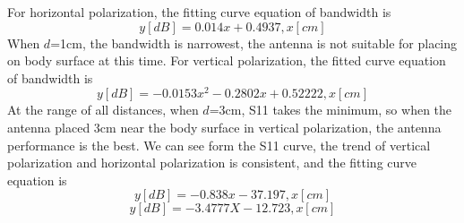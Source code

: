 \documentclass[journal]{IEEEtran}
\begin{document}
For horizontal polarization, the fitting curve equation of bandwidth is
\begin{equation}
\label{eq:eps_6}
y[dB]=0.014x+0.4937, x[cm]
\end{equation}
When $d$=1cm, the bandwidth is narrowest, the antenna is not suitable for placing on body surface at this time. For
vertical polarization, the fitted curve equation of bandwidth is
\begin{equation}
\label{eq:eps_7}
y[dB]=-0.0153x^2-0.2802x+0.52222, x[cm]
\end{equation}
At the range of all distances, when $d$=3cm, S11 takes the minimum, so when the antenna placed 3cm near the body
surface in vertical polarization, the antenna performance is the best. We can see form the S11 curve, the trend of vertical
polarization and horizontal polarization is consistent, and the fitting curve equation is
\begin{equation}
\label{eq:eps_8}
y[dB]=-0.838x-37.197, x[cm]
\end{equation}
\begin{equation}
\label{eq:eps_9}
y[dB]=-3.4777X-12.723, x[cm]
\end{equation}
\end{document}

